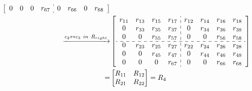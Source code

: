 \documentclass[12pt]{article}
\begin{document}
\begin{align*}
\begin{bmatrix}
\begin{array}{cccc:cccc}
 0      & 0      & 0      & r_{67} & 0      & r_{66} & 0      & r_{68}\\
\end{array}
\end{bmatrix}\\
\xrightarrow{c_{2} \leftrightarrow c_{3}\ in\ R_{right}}
&\begin{bmatrix}
\begin{array}{cccc:cccc}
 r_{11} & r_{13} & r_{15} & r_{17} & r_{12} & r_{14} & r_{16} & r_{18}\\
 0      & r_{33} & r_{35} & r_{37} & 0      & r_{34} & r_{36} & r_{38}\\
 0      & 0      & r_{55} & r_{57} & 0      & 0      & r_{56} & r_{58}\\
 \cdashline{1-8}
 0      & r_{23} & r_{25} & r_{27} & r_{22} & r_{24} & r_{26} & r_{28}\\
 0      & 0      & r_{45} & r_{47} & 0      & r_{44} & r_{46} & r_{48}\\
 0      & 0      & 0      & r_{67} & 0      & 0      & r_{66} & r_{68}\\
\end{array}
\end{bmatrix} \\
=&\begin{bmatrix}
    R_{11} & R_{12}\\R_{21} & R_{22}
\end{bmatrix} = R_4
\end{align*}
\end{document}
